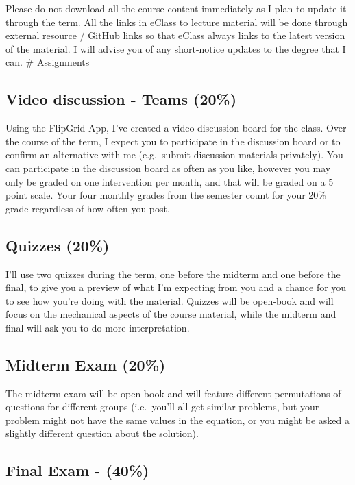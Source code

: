 \documentclass[11pt,]{article}
\begin{document}
Please do not download all the course content immediately as I plan to
update it through the term. All the links in eClass to lecture material
will be done through external resource / GitHub links so that eClass
always links to the latest version of the material. I will advise you of
any short-notice updates to the degree that I can. \# Assignments

\hypertarget{video-discussion---teams-20}{%
\subsection{Video discussion - Teams
(20\%)}\label{video-discussion---teams-20}}

Using the FlipGrid App, I've created a video discussion board for the
class. Over the course of the term, I expect you to participate in the
discussion board or to confirm an alternative with me (e.g.~submit
discussion materials privately). You can participate in the discussion
board as often as you like, however you may only be graded on one
intervention per month, and that will be graded on a 5 point scale. Your
four monthly grades from the semester count for your 20\% grade
regardless of how often you post.

\hypertarget{quizzes-20}{%
\subsection{Quizzes (20\%)}\label{quizzes-20}}

I'll use two quizzes during the term, one before the midterm and one
before the final, to give you a preview of what I'm expecting from you
and a chance for you to see how you're doing with the material. Quizzes
will be open-book and will focus on the mechanical aspects of the course
material, while the midterm and final will ask you to do more
interpretation.

\hypertarget{midterm-exam-20}{%
\subsection{Midterm Exam (20\%)}\label{midterm-exam-20}}

The midterm exam will be open-book and will feature different
permutations of questions for different groups (i.e.~you'll all get
similar problems, but your problem might not have the same values in the
equation, or you might be asked a slightly different question about the
solution).

\hypertarget{final-exam---40}{%
\subsection{Final Exam - (40\%)}\label{final-exam---40}}
\end{document}
